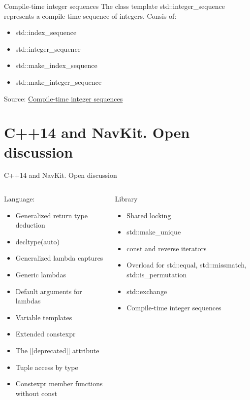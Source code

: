 \documentclass{beamer}
\begin{document}
\begin{frame}{Compile-time integer sequences}
The class template std::integer\_sequence represents a compile-time sequence of integers.
Consis of:
\begin{itemize}
\item std::index\_sequence
\item std::integer\_sequence
\item std::make\_index\_sequence
\item std::make\_integer\_sequence
\end{itemize}
\vfill
Source: \href{http://www.open-std.org/jtc1/sc22/wg21/docs/papers/2013/n3658.html}{Compile-time integer sequences}
\end{frame}


\section{C++14 and NavKit. Open discussion}


\begin{frame}{C++14 and NavKit. Open discussion}
\begin{columns}[T]
\begin{column}{0.5\textwidth}
Language:
\begin{itemize}
\item Generalized return type deduction
\item decltype(auto)
\item Generalized lambda captures
\item Generic lambdas 
\item Default arguments for lambdas
\item Variable templates 
\item Extended constexpr
\item The [[deprecated]] attribute
\item Tuple access by type
\item Constexpr member functions without const
\end{itemize}
\end{column}
\begin{column}{0.5\textwidth}
Library
\begin{itemize}
\item Shared locking
\item std::make\_unique
\item const and reverse iterators
\item Overload for std::equal, std::missmatch, std::is\_permutation
\item std::exchange
\item Compile-time integer sequences
\end{itemize}
\end{column}
\end{columns}
\end{frame}	
\end{document}
